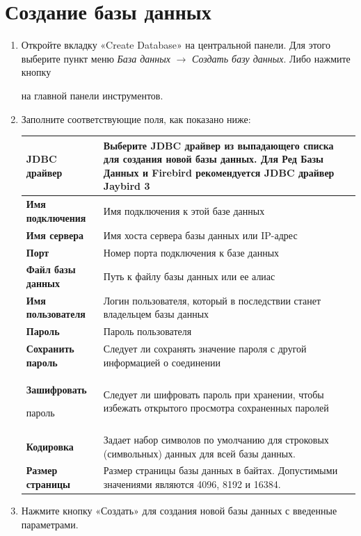 \section{Создание базы данных}\label{sec:create_db}
\begin{enumerate}[leftmargin=15pt]
	\item Откройте вкладку «Create Database» на центральной панели. Для этого выберите пункт меню \textit{База данных} $\rightarrow$ \textit{Создать базу данных}. Либо нажмите кнопку 
	на главной панели инструментов.
	\item Заполните соответствующие поля, как показано ниже:
	\begin{longtable}[r]{|>{\bfseries}m{3.9cm}|m{11cm}|}
		\hline
		JDBC драйвер & Выберите JDBC драйвер из выпадающего списка для создания новой базы данных. Для Ред Базы Данных и Firebird рекомендуется JDBC драйвер Jaybird 3 \\\hline
		Имя подключения & Имя подключения к этой базе данных \\\hline
		Имя сервера & Имя хоста сервера базы данных или IP-адрес\\\hline
		Порт & Номер порта подключения к базе данных \\\hline
		Файл базы данных & Путь к файлу базы данных или ее алиас\\\hline
		Имя пользователя & Логин пользователя, который в последствии станет владельцем базы данных\\\hline
		Пароль & Пароль пользователя \\\hline
		Сохранить пароль & Следует ли сохранять значение пароля с другой информацией о соединении\\\hline
		Зашифровать 
		
		пароль 	& Следует ли шифровать пароль при хранении, чтобы избежать открытого просмотра сохраненных паролей\\\hline
		Кодировка & Задает набор символов по умолчанию для строковых
		(символьных) данных для всей базы данных.  \\\hline
		Размер страницы & Размер страницы базы данных в байтах. Допустимыми значениями являются 4096, 8192 и 16384. \\\hline
	\end{longtable}
	
	\item Нажмите кнопку «Создать» для создания новой базы данных с введенные параметрами. 
\end{enumerate}	

